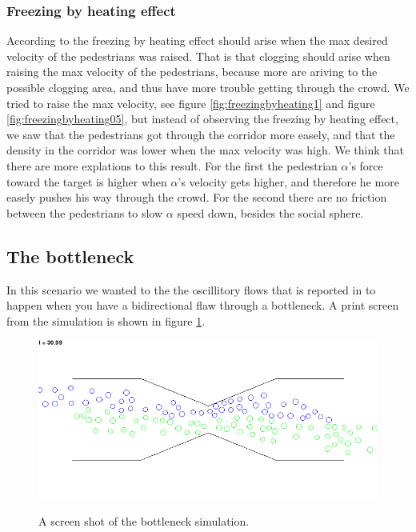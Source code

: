 \subsubsection{Freezing by heating effect}
According to \cite{self-org} the freezing by heating effect should arise when the max desired velocity of the pedestrians was raised.
That is that clogging should arise when raising the max velocity of the pedestrians, because more are ariving to the possible
clogging area, and thus have more trouble getting through the crowd. 
We tried to raise the max velocity, see figure \ref{fig:freezingbyheating1} and figure \ref{fig:freezingbyheating05}, but instead of observing the freezing by heating effect, we saw that the pedestrians
got through the corridor more easely, and that the density in the corridor was lower when the max velocity was high.
We think that there are more explations to this result. For the first the pedestrian $\alpha$'s force toward the target
is higher when $\alpha$'s velocity gets higher, and therefore he more easely pushes his way through the crowd. For the second
there are no friction between the pedestrians to slow $\alpha$ speed down, besides the social sphere.

\subsection{The bottleneck}
In this scenario we wanted to the the oscillitory flows that is reported 
in \cite{self-org} to happen when you have a bidirectional flaw through a 
bottleneck. A print screen from the simulation is shown in figure 
\ref{fig:bottleneckbidirec}.

\begin{figure}[h]
\centering
{\includegraphics[scale=0.35]{Figures/bottleneck.png}}
\caption{A screen shot of the bottleneck simulation.}
\label{fig:bottleneckbidirec}
\end{figure}

